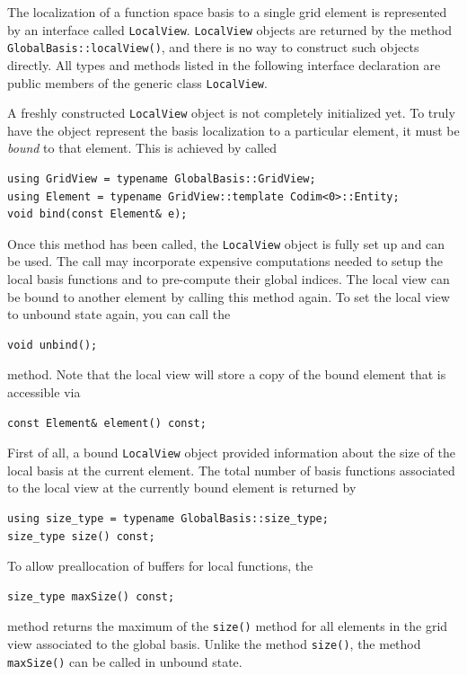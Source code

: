 \documentclass[a4paper,10pt,headings=normal,bibliography=totoc]{scrartcl}
\newcommand{\cpp}[1]{\lstinline[basicstyle=\ttfamily]!#1!}
\begin{document}
The localization of a function space basis to a single grid element is represented
by an interface called \cpp{LocalView}.
\cpp{LocalView} objects are returned by the method \cpp{GlobalBasis::localView()},
and there is no way to construct such objects directly.
All types and methods listed in the following
interface declaration are public members of
the generic class \cpp{LocalView}.

A freshly constructed \cpp{LocalView} object is not completely initialized yet.
To truly have the object represent the basis localization to a particular element,
it must be \emph{bound} to that element.  This is achieved by called
\begin{lstlisting}[style=Interface]
using GridView = typename GlobalBasis::GridView;
using Element = typename GridView::template Codim<0>::Entity;
void bind(const Element& e);
\end{lstlisting}
Once this method has been called, the \cpp{LocalView} object is fully set up
and can be used.
The call may incorporate expensive computations needed to
setup the local basis functions and to pre-compute their global indices.
The local view can be
bound to another element by calling this method again.
To set the local view to unbound state again, you
can call the
\begin{lstlisting}[style=Interface]
void unbind();
\end{lstlisting}
method.
Note that the local view will store a copy of the bound
element that is accessible via
\begin{lstlisting}[style=Interface]
const Element& element() const;
\end{lstlisting}

First of all, a bound \cpp{LocalView} object provided information
about the size of the local basis at the current element.
The total number of basis functions associated to the
local view at the currently bound element is returned by
\begin{lstlisting}[style=Interface]
using size_type = typename GlobalBasis::size_type;
size_type size() const;
\end{lstlisting}
To allow preallocation of buffers for local functions, the
\begin{lstlisting}[style=Interface]
size_type maxSize() const;
\end{lstlisting}
method returns the maximum of the
\cpp{size()} method for all elements in the grid view
associated to the global basis.  Unlike the method \cpp{size()},
the method \cpp{maxSize()} can be called in unbound state.
\end{document}
